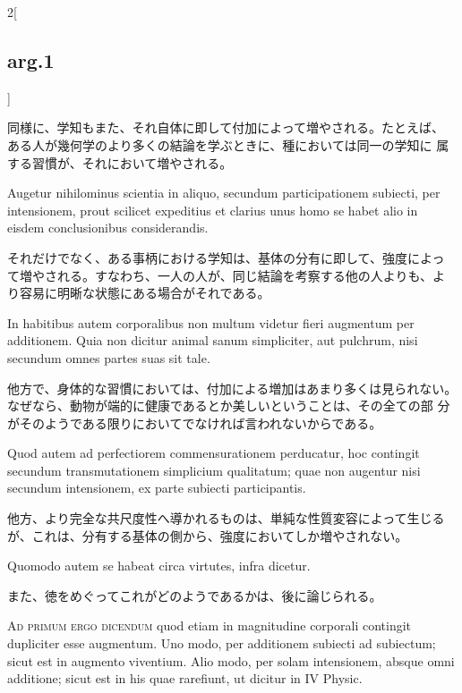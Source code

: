 \documentclass[paper=a4paper,fontsize=10pt,jafontsize=9pt,titlepage]{jlreq}
\begin{document}
\begin{paracol}{2}[\subsection{arg.1}]
\switchcolumn

同様に、学知もまた、それ自体に即して付加によって増やされる。たとえば、
ある人が幾何学のより多くの結論を学ぶときに、種においては同一の学知に
属する習慣が、それにおいて増やされる。

\switchcolumn*

Augetur nihilominus scientia in aliquo, secundum
participationem subiecti, per intensionem, prout scilicet expeditius
et clarius unus homo se habet alio in eisdem conclusionibus
considerandis.

\switchcolumn

それだけでなく、ある事柄における学知は、基体の分有に即して、強度によっ
て増やされる。すなわち、一人の人が、同じ結論を考察する他の人よりも、よ
り容易に明晰な状態にある場合がそれである。

\switchcolumn*

In habitibus autem corporalibus non multum videtur
fieri augmentum per additionem. Quia non dicitur animal sanum
simpliciter, aut pulchrum, nisi secundum omnes partes suas sit
tale.

\switchcolumn

他方で、身体的な習慣においては、付加による増加はあまり多くは見られない。
 なぜなら、動物が端的に健康であるとか美しいということは、その全ての部
 分がそのようである限りにおいてでなければ言われないからである。

\switchcolumn*

Quod autem ad perfectiorem commensurationem perducatur, hoc
contingit secundum transmutationem simplicium qualitatum; quae non
augentur nisi secundum intensionem, ex parte subiecti
participantis.

\switchcolumn

他方、より完全な共尺度性へ導かれるものは、単純な性質変容によって生じる
 が、これは、分有する基体の側から、強度においてしか増やされない。

\switchcolumn*

Quomodo autem se habeat circa virtutes, infra dicetur.

\switchcolumn

また、徳をめぐってこれがどのようであるかは、後に論じられる。

\switchcolumn*[\subsection{ad.1}]

{\scshape Ad primum ergo dicendum} quod etiam in magnitudine corporali contingit
dupliciter esse augmentum. Uno modo, per additionem subiecti ad
subiectum; sicut est in augmento viventium. Alio modo, per solam
intensionem, absque omni additione; sicut est in his quae rarefiunt,
ut dicitur in IV Physic.


\end{paracol}
\end{document}
